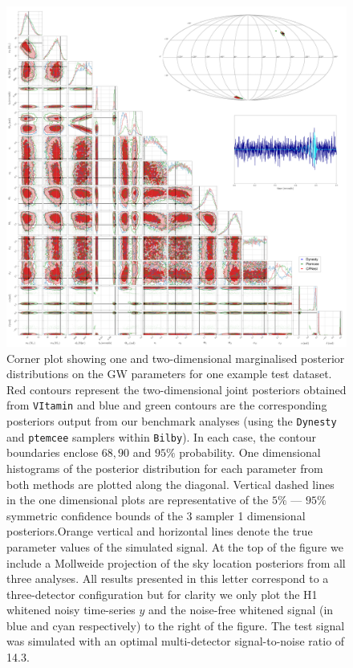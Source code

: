 \documentclass[%
showpacs,
nofootinbib,
 amsmath,amssymb,
 aps,
 twocolumn,
 prl,
 reprint,
floatfix,
]{revtex4-1}
\begin{document}
%
%
\begin{figure}
    \includegraphics[width=\textwidth]{corner_testcase0.png}
    \caption{\label{fig:corner_plot} Corner plot showing one and two-dimensional
marginalised posterior distributions on the \ac{GW} parameters for one
example test dataset. Red contours represent the
two-dimensional joint posteriors obtained from \texttt{VItamin} and
blue and green contours are the corresponding posteriors
output from our benchmark analyses (using the \texttt{Dynesty} and \texttt{ptemcee}
samplers within \texttt{Bilby}). In each case, the contour boundaries enclose
$68,90$ and $95\%$ probability. One dimensional histograms of the posterior
distribution for each parameter from both methods are plotted along the
diagonal. Vertical dashed lines in the one dimensional plots are representative of the
 $5\%$ --- $95\%$ symmetric confidence bounds of the 3 sampler 1 dimensional posteriors.Orange vertical and horizontal lines denote the true parameter
values of the simulated signal. At the top of the figure we include a Mollweide
projection of the sky location posteriors from all three analyses. All results
presented in this letter correspond to a three-detector configuration but for
clarity we only plot the H1 whitened noisy time-series $y$ and the noise-free
whitened signal (in blue and cyan respectively) to the right of the figure. The
test signal was simulated with an optimal multi-detector signal-to-noise ratio of
14.3.} 
\end{figure}
\end{document}
